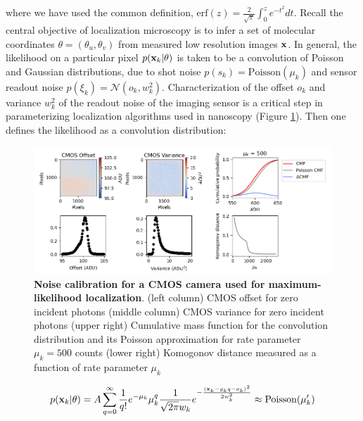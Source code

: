 where we have used the common definition, $\mathrm{erf}(z) = \frac{2}{\sqrt{\pi}}\int_{0}^{z}e^{-t^{2}}dt$. Recall the central objective of localization microscopy is to infer a set of molecular coordinates $\theta=(\theta_{u},\theta_{v})$ from measured low resolution images $\bold{x}$. In general, the likelihood on a particular pixel $p(\bold{x}_k\lvert\theta)$ is taken to be a convolution of Poisson and Gaussian distributions, due to shot noise $p(s_{k}) = \mathrm{Poisson}(\mu_{k})$ and sensor readout noise $p(\xi_{k}) = \mathcal{N}(o_{k},w_{k}^{2})$. Characterization of the offset $o_{k}$ and variance $w_{k}^{2}$ of the readout noise of the imaging sensor is a critical step in parameterizing localization algorithms used in nanoscopy (Figure \ref{fig:fig2}). Then one defines the likelihood as a convolution distribution:

\begin{figure}[t]
\begin{center}
\includegraphics[width=16cm]{media/Noise.png}
\end{center}
\caption{\textbf{Noise calibration for a CMOS camera used for maximum-likelihood localization}. (left column) CMOS offset for zero incident photons (middle column) CMOS variance for zero incident photons (upper right) Cumulative mass function for the convolution distribution and its Poisson approximation for rate parameter $\mu_{k} = 500$ counts (lower right) Komogonov distance measured as a function of rate parameter $\mu_{k}$}
\label{fig:fig2}
\end{figure}

\begin{equation}
p(\bold{x}_{k}\lvert\theta) = A\sum_{q=0}^{\infty} \frac{1}{q!}e^{-\mu_{k}}\mu_{k}^{q}\frac{1}{\sqrt{2\pi}w_{k}}e^{-\frac{(\bold{x}_{k}-g_{k}q-o_{k})^2}{2 w_{k}^{2}}} \approx \mathrm{Poisson}(\mu_{k}')
\end{equation}

